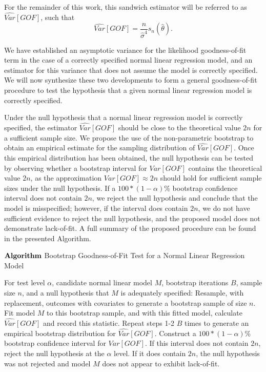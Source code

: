 \documentclass[submit]{smj}
\begin{document}
		For the remainder of this work, this sandwich estimator will be referred to as $\widehat{Var}[GOF]$, such that
		\begin{equation*}
			\widehat{Var}[GOF] = \frac{n}{\hat{\sigma}^4} s_n(\hat{\theta}) .
		\end{equation*}

		We have established an asymptotic variance for the likelihood goodness-of-fit term in the case of a correctly specified normal linear regression model, and an
		estimator for this variance that does not assume the model is correctly specified. We will now synthesize these two developments to form a general goodness-of-fit procedure to
		test the hypothesis that a given normal linear regression model is correctly specified.

		Under the null hypothesis that a normal linear regression model is correctly specified, the estimator $\widehat{Var}[GOF]$ should be close to the theoretical value $2n$ for a
		sufficient sample size. We propose the use of the non-parametric bootstrap to obtain an empirical estimate for the sampling distribution of $\widehat{Var}[GOF]$. Once this empirical distribution
		has been obtained, the null hypothesis can be tested by observing whether a bootstrap interval for $Var[GOF]$ contains the theoretical value $2n$, as the approximation
		$Var[GOF] \approx 2n$ should hold for sufficient sample sizes under the null hypothesis. If a $100*(1-\alpha)$\% bootstrap confidence interval does not contain 
		$2n$, we reject the null hypothesis and conclude that the model is misspecified; however, if the interval does contain $2n$, we do not have sufficient evidence to reject
		the null hypothesis, and the proposed model does not demonstrate lack-of-fit. A full summary of the proposed procedure can be found in the presented Algorithm.
		\begin{algorithm*}[h]
			\caption*{$\bf{Algorithm}$ Bootstrap Goodness-of-Fit Test for a Normal Linear Regression Model}
			\begin{algorithmic}[1]
			  \Statex For test level $\alpha$, candidate normal linear model $M$, bootstrap iterations $B$, sample size $n$, and a null hypothesis that $M$
			  is adequately specified:
			  \State Resample, with replacement, outcomes with covariates to generate a bootstrap sample of size $n$.
			  \State Fit model $M$ to this bootstrap sample, and with this fitted model, calculate $\widehat{Var}[GOF]$
			  and record this statistic.
			  \State Repeat steps 1-2 $B$ times to generate an empirical bootstrap distribution for $\widehat{Var}[GOF]$.
			  \State Construct a $100*(1-\alpha)$\% bootstrap confidence interval for $Var[GOF]$.
			  \State If this interval does not contain $2n$, reject the null hypothesis at the $\alpha$ level. If it does contain
			  $2n$, the null hypothesis was not rejected and model $M$ does not appear to exhibit lack-of-fit. 
			\end{algorithmic}
		\end{algorithm*}
\end{document}
